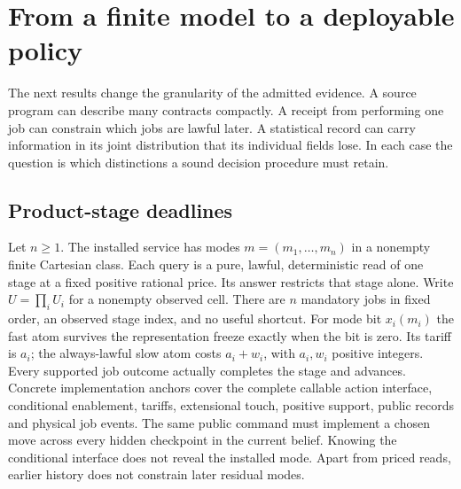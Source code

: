 \section{From a finite model to a deployable policy}\label{app:extensions}

The next results change the granularity of the admitted evidence. A source program can describe many contracts compactly. A receipt from performing one job can constrain which jobs are lawful later. A statistical record can carry information in its joint distribution that its individual fields lose. In each case the question is which distinctions a sound decision procedure must retain.

\subsection{Product-stage deadlines}

Let \(n\ge1\). The installed service has modes \(m=(m_1,\ldots,m_n)\) in a nonempty finite Cartesian class. Each query is a pure, lawful, deterministic read of one stage at a fixed positive rational price. Its answer restricts that stage alone. Write \(U=\prod_i U_i\) for a nonempty observed cell. There are \(n\) mandatory jobs in fixed order, an observed stage index, and no useful shortcut. For mode bit \(x_i(m_i)\) the fast atom survives the representation freeze exactly when the bit is zero. Its tariff is \(a_i\); the always-lawful slow atom costs \(a_i+w_i\), with \(a_i,w_i\) positive integers. Every supported job outcome actually completes the stage and advances. Concrete implementation anchors cover the complete callable action interface, conditional enablement, tariffs, extensional touch, positive support, public records and physical job events. The same public command must implement a chosen move across every hidden checkpoint in the current belief. Knowing the conditional interface does not reveal the installed mode. Apart from priced reads, earlier history does not constrain later residual modes.

